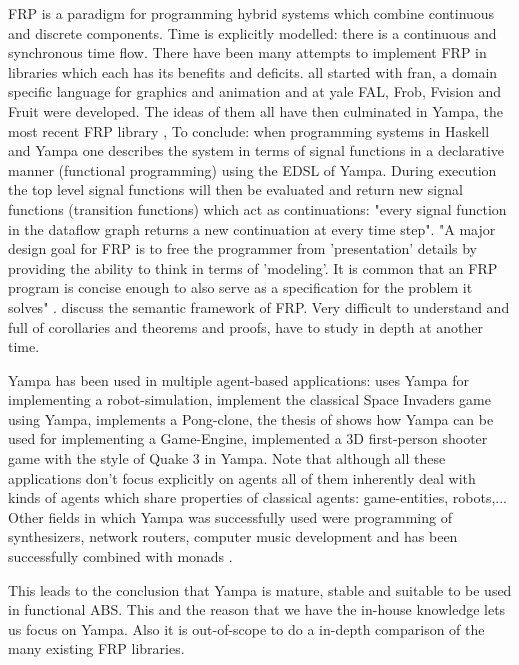 FRP is a paradigm for programming hybrid systems which combine continuous and discrete components. Time is explicitly modelled: there is a continuous and synchronous time flow. There have been many attempts to implement FRP in libraries which each has its benefits and deficits. all started with fran, a domain specific language for graphics and animation and at yale FAL, Frob, Fvision and Fruit were developed. The ideas of them all have then culminated in Yampa, the most recent FRP library \cite{nilsson_functional_2002}, 
To conclude: when programming systems in Haskell and Yampa one describes the system in terms of signal functions in a declarative manner (functional programming) using the EDSL of Yampa. During execution the top level signal functions will then be evaluated and return new signal functions (transition functions) which act as continuations: "every signal function in the dataflow graph returns a new continuation at every time step".
"A major design goal for FRP is to free the programmer from 'presentation' details by providing the ability to think in terms of 'modeling'. It is common that an FRP program is concise enough to also serve as a specification for the problem it solves" \cite{wan_functional_2000}. \cite{wan_functional_2000} discuss the semantic framework of FRP. Very difficult to understand and full of corollaries and theorems and proofs, have to study in depth at another time.

Yampa has been used in multiple agent-based applications: \cite{hudak_arrows_2003} uses Yampa for implementing a robot-simulation, \cite{courtney_yampa_2003} implement the classical Space Invaders game using Yampa, \cite{nilsson_declarative_2014} implements a Pong-clone, the thesis of \cite{meisinger_game-engine-architektur_2010} shows how Yampa can be used for implementing a Game-Engine, \cite{mun_hon_functional_2005} implemented a 3D first-person shooter game with the style of Quake 3 in Yampa. Note that although all these applications don't focus explicitly on agents all of them inherently deal with kinds of agents which share properties of classical agents: game-entities, robots,... Other fields in which Yampa was successfully used were programming of synthesizers, network routers, computer music development and has been successfully combined with monads \cite{perez_functional_2016}.

This leads to the conclusion that Yampa is mature, stable and suitable to be used in functional ABS. This and the reason that we have the in-house knowledge lets us focus on Yampa. Also it is out-of-scope to do a in-depth comparison of the many existing FRP libraries.

